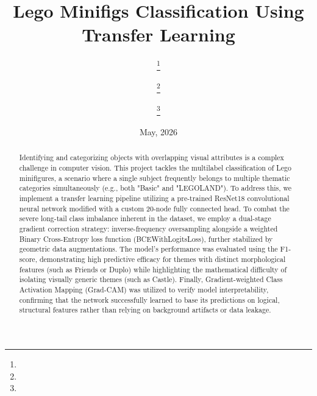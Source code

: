 \documentclass[11pt, a4paper]{article}
\theoremstyle{remark}
\renewcommand*{\thefootnote}{\fnsymbol{footnote}}
\begin{document}
\title{Lego Minifigs Classification Using Transfer Learning
}

\author[1,2]{%
\thanks{%
}}

\author[2]{%
\thanks{%
}}

\author[1,3]{%
\thanks{%
}}

\affil[1]{%
}
\affil[2]{%
}
\affil[3]{%
}

\date{May, 2026
}

\maketitle

\renewcommand*{\thefootnote}{\arabic{footnote}}
\setcounter{footnote}{0}

\begin{abstract}
Identifying and categorizing objects with overlapping visual attributes is a complex challenge in computer vision. 
This project tackles the multilabel classification of Lego minifigures, a scenario where a single subject frequently belongs 
to multiple thematic categories simultaneously (e.g., both "Basic" and "LEGOLAND"). To address this, we implement a transfer 
learning pipeline utilizing a pre-trained ResNet18 convolutional neural network modified with a custom 20-node fully connected head. 
To combat the severe long-tail class imbalance inherent in the dataset, we employ a dual-stage gradient correction strategy: 
inverse-frequency oversampling alongside a weighted Binary Cross-Entropy loss function (BCEWithLogitsLoss), further stabilized 
by geometric data augmentations. The model's performance was evaluated using the F1-score, demonstrating high predictive efficacy 
for themes with distinct morphological features (such as Friends or Duplo) while highlighting the mathematical difficulty of 
isolating visually generic themes (such as Castle). Finally, Gradient-weighted Class Activation Mapping (Grad-CAM) was utilized
 to verify model interpretability, confirming that the network successfully learned to base its predictions on logical, structural 
 features rather than relying on background artifacts or data leakage.
\end{abstract}

\end{document}
